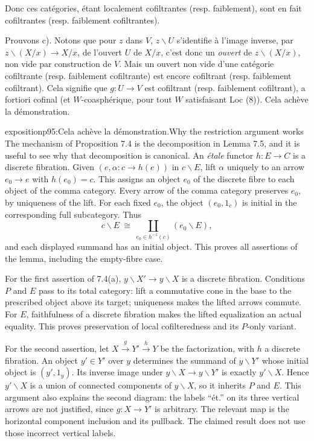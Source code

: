 Donc ces catégories, étant localement cofiltrantes (resp. faiblement), sont en fait cofiltrantes (resp. faiblement cofiltrantes).

Prouvons c). Notons que pour $z$ dans $V$, $z\backslash U$ s'identifie à l'image inverse, par $z\backslash(X/x) \longrightarrow X/x$, de l'ouvert $U$ de $X/x$, c'est donc un \textit{ouvert} de $z\backslash(X/x)$, non vide par construction de $V$. Mais un ouvert non vide d'une catégorie cofiltrante (resp. faiblement cofiltrante) est encore cofiltrant (resp. faiblement cofiltrant). Cela signifie que $g : U \longrightarrow V$ est cofiltrant (resp. faiblement cofiltrant), a fortiori cofinal (et $W$-coasphérique, pour tout $W$ satisfaisant Loc (8)). Cela achève la démonstration.

\begin{dcomment}{exposition}{p95:Cela achève la démonstration.}{Why the restriction argument works}
The mechanism of Proposition 7.4 is the decomposition in Lemma 7.5, and it is useful to see why that decomposition is canonical. An \emph{\'etale} functor $h:E\to C$ is a discrete fibration. Given $(e,\alpha:c\to h(e))$ in $c\backslash E$, lift $\alpha$ uniquely to an arrow $e_0\to e$ with $h(e_0)=c$. This assigns an object $e_0$ of the discrete fibre to each object of the comma category. Every arrow of the comma category preserves $e_0$, by uniqueness of the lift. For each fixed $e_0$, the object $(e_0,1_c)$ is initial in the corresponding full subcategory. Thus
\[
c\backslash E\ \cong\
\coprod_{e_0\in h^{-1}(c)}(e_0\backslash E),
\]
and each displayed summand has an initial object. This proves all assertions of the lemma, including the empty-fibre case.

For the first assertion of 7.4(a), $y\backslash X'\to y\backslash X$ is a discrete fibration. Conditions $P$ and $E$ pass to its total category: lift a commutative cone in the base to the prescribed object above its target; uniqueness makes the lifted arrows commute. For $E$, faithfulness of a discrete fibration makes the lifted equalization an actual equality. This proves preservation of local cofilteredness and its $P$-only variant.

For the second assertion, let $X\xrightarrow{g}Y'\xrightarrow{h}Y$ be the factorization, with $h$ a discrete fibration. An object $y'\in Y'$ over $y$ determines the summand of $y\backslash Y'$ whose initial object is $(y',1_y)$. Its inverse image under $y\backslash X\to y\backslash Y'$ is exactly $y'\backslash X$. Hence $y'\backslash X$ is a union of connected components of $y\backslash X$, so it inherits $P$ and $E$. This argument also explains the second diagram: the labels ``\'et.'' on its three vertical arrows are not justified, since $g:X\to Y'$ is arbitrary. The relevant map is the horizontal component inclusion and its pullback. The claimed result does not use those incorrect vertical labels.


\end{dcomment}

